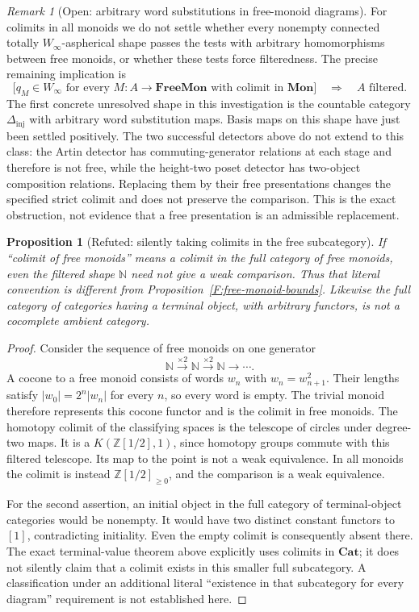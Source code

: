 \documentclass[11pt,a4paper]{article}
\newtheorem{proposition}[theorem]{Proposition}
\theoremstyle{definition}
\theoremstyle{remark}
\newtheorem{remark}[theorem]{Remark}
\newcommand{\Cat}{\mathbf{Cat}}
\newcommand{\Winfty}{W_\infty}
\begin{document}
\begin{remark}[Open: arbitrary word substitutions in free-monoid diagrams]
\label{F:free-monoid-open}
For colimits in all monoids we do not settle whether every nonempty
connected totally $\Winfty$-aspherical shape passes the tests with
arbitrary homomorphisms between free monoids, or whether these tests
force filteredness.  The precise remaining implication is
\[
 \bigl[q_M\in\Winfty\text{ for every }M:A\to\mathbf{FreeMon}
       \text{ with colimit in }\mathbf{Mon}\bigr]
 \quad\Longrightarrow\quad A\text{ filtered}.
\]
The first concrete unresolved shape in this investigation is the
countable category $\Delta_{\mathrm{inj}}$ with arbitrary word
substitution maps.  Basis maps on this shape have just been settled
positively.  The two successful detectors above do not extend to
this class: the Artin detector has commuting-generator relations at
each stage and therefore is not free, while the height-two poset
detector has two-object composition relations.  Replacing them by
their free presentations changes the specified strict colimit and
does not preserve the comparison.  This is the exact obstruction,
not evidence that a free presentation is an admissible replacement.
\end{remark}

\begin{proposition}[Refuted: silently taking colimits in the free subcategory]
\label{F:literal-free-colimit}
If ``colimit of free monoids'' means a colimit in the full category
of free monoids, even the filtered shape $\mathbb N$ need not give
a weak comparison.  Thus that literal convention is different
from Proposition~\ref{F:free-monoid-bounds}.  Likewise the full
category of categories having a terminal object, with arbitrary
functors, is not a cocomplete ambient category.
\end{proposition}
\begin{proof}
Consider the sequence of free monoids on one generator
\[
 \mathbb N\xrightarrow{\times2}\mathbb N
 \xrightarrow{\times2}\mathbb N\longrightarrow\cdots.
\]
A cocone to a free monoid consists of words $w_n$ with
$w_n=w_{n+1}^2$.  Their lengths satisfy
$|w_0|=2^n|w_n|$ for every $n$, so every word is empty.
The trivial monoid therefore represents this cocone functor and
is the colimit in free monoids.  The homotopy colimit of the
classifying spaces is the telescope of circles under degree-two
maps.  It is a $K(\mathbb Z[1/2],1)$, since homotopy groups commute
with this filtered telescope.  Its map to the point is not a weak
equivalence.  In all monoids the colimit is instead
$\mathbb Z[1/2]_{\geq0}$, and the comparison is a weak equivalence.

For the second assertion, an initial object in the full category
of terminal-object categories would be nonempty.  It would have
two distinct constant functors to $[1]$, contradicting initiality.
Even the empty colimit is consequently absent there.  The exact
terminal-value theorem above explicitly uses colimits in $\Cat$;
it does not silently claim that a colimit exists in this smaller
full subcategory.  A classification under an additional literal
``existence in that subcategory for every diagram'' requirement
is not established here.
\end{proof}
\end{document}
